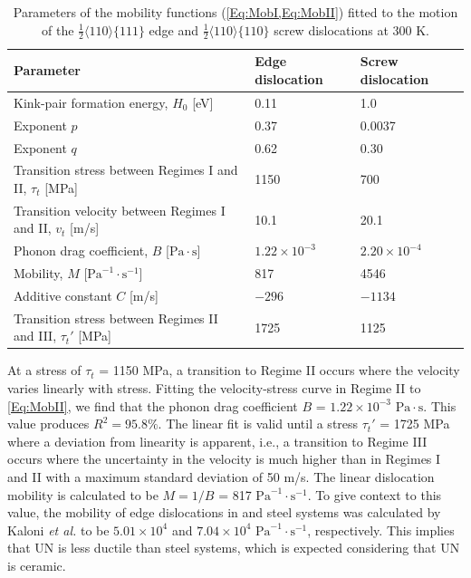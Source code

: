 \documentclass[applsci,article,submit,pdftex,moreauthors]{Definitions/mdpi}
\newcommand{\?}{\stackrel{?}{=}}
\begin{document}
\begin{table}[h!]
\centering
\caption{Parameters of the mobility functions (\cref{Eq:MobI,Eq:MobII}) fitted to the motion of the $\frac{1}{2}\langle110\rangle\{111\}$ edge and $\frac{1}{2}\langle110\rangle\{110\}$ screw dislocations at 300 K.}
\footnotesize
\begin{tabular}{lll}
\hline
Parameter & Edge dislocation & Screw dislocation \\
\hline
Kink-pair formation energy, $H_0$ [eV] & 0.11 & 1.0 \\
Exponent $p$ & 0.37 & 0.0037 \\
Exponent $q$ & 0.62 & 0.30 \\
Transition stress between Regimes I and II, $\tau_t$ [MPa] & 1150 & 700 \\
Transition velocity between Regimes I and II, $v_t$ [m/s] & 10.1 & 20.1 \\
Phonon drag coefficient, $B$ [$\mathrm{Pa} \! \cdot \! \mathrm{s}$] & $1.22 \times 10^{-3}$ & $2.20 \times 10^{-4}$ \\ 
Mobility, $M$ [$\mathrm{Pa}^{-1} \! \cdot \! \mathrm{s}^{-1}$] & 817 & 4546 \\
Additive constant $C$ [m/s] & $-296$ & $-1134$ \\
Transition stress between Regimes II and III, $\tau_t'$ [MPa] & 1725 & 1125 \\
\hline
\end{tabular}
\label{Tab:DislocParams}
\end{table}

At a stress of $\tau_t$ = 1150 MPa, a transition to Regime II occurs where the velocity varies linearly with stress. Fitting the velocity-stress curve in Regime II to \cref{Eq:MobII}, we find that the phonon drag coefficient $B$ = $1.22 \times 10^{-3}$ $\mathrm{Pa} \! \cdot \! \mathrm{s}$. This value produces $R^2 = 95.8\%$. The linear fit is valid until a stress $\tau_t'$ = 1725 MPa where a deviation from linearity is apparent, i.e., a transition to Regime III occurs where the uncertainty in the velocity is much higher than in Regimes I and II with a maximum standard deviation of 50 m/s. The linear dislocation mobility is calculated to be $M = 1/B$ = 817 $\mathrm{Pa}^{-1} \! \cdot \! \mathrm{s}^{-1}$. To give context to this value, the mobility of edge dislocations in  and  steel systems was calculated by Kaloni \textit{et al.} \cite{Kaloni2023} to be $5.01 \times 10^4$ and $7.04 \times 10^4$ $\mathrm{Pa}^{-1} \! \cdot \! \mathrm{s}^{-1}$, respectively. This implies that UN is less ductile than steel systems, which is expected considering that UN is ceramic.
\end{document}
